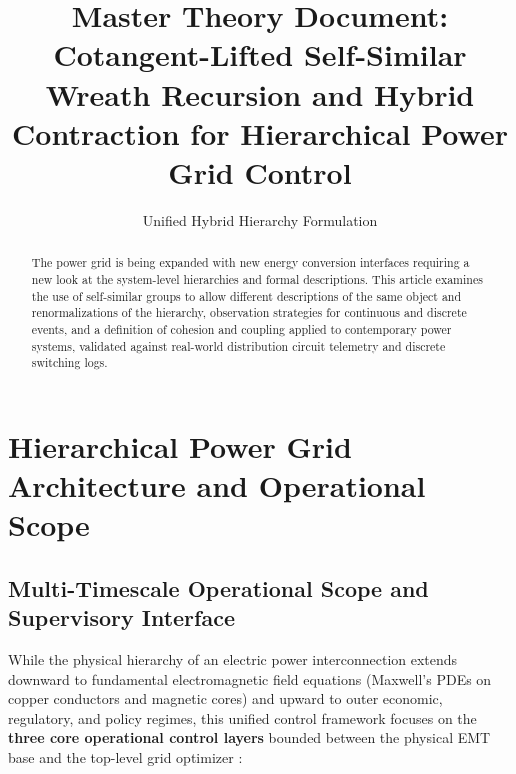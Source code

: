 \documentclass[11pt]{article}
\title{\textbf{Master Theory Document: Cotangent-Lifted Self-Similar Wreath Recursion and Hybrid Contraction for Hierarchical Power Grid Control}}
\author{Unified Hybrid Hierarchy Formulation}
\date{}
\begin{document}
\maketitle

\begin{abstract}
The power grid is being expanded with new energy conversion interfaces requiring a new look at the system-level hierarchies and formal descriptions. This article examines the use of self-similar groups to allow different descriptions of the same object and renormalizations of the hierarchy, observation strategies for continuous and discrete events, and a definition of cohesion and coupling applied to contemporary power systems, validated against real-world distribution circuit telemetry and discrete switching logs.
\end{abstract}

\section{Hierarchical Power Grid Architecture and Operational Scope}
\subsection{Multi-Timescale Operational Scope and Supervisory Interface}

While the physical hierarchy of an electric power interconnection extends downward to fundamental electromagnetic field equations (Maxwell's PDEs on copper conductors and magnetic cores) and upward to outer economic, regulatory, and policy regimes, this unified control framework focuses on the \textbf{three core operational control layers} bounded between the physical EMT base and the top-level grid optimizer \cite{Sherman2026, Pappas2000, GirardPappas2009}:
\end{document}
